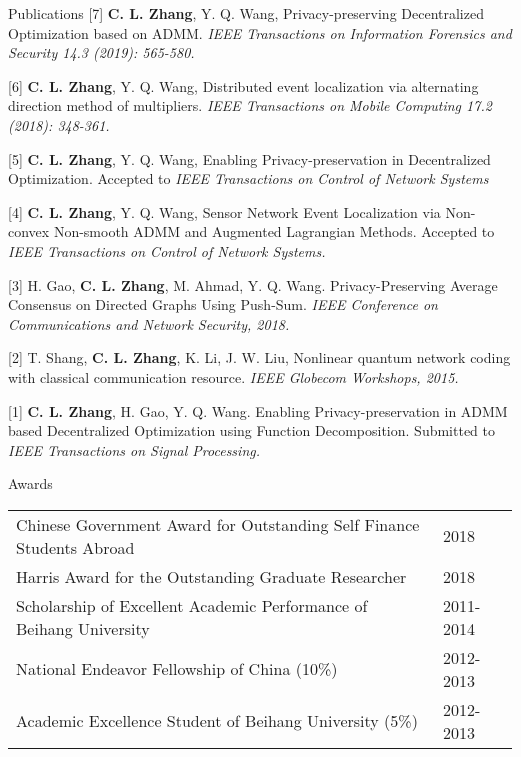 \documentclass{resume} %
\begin{document}
\vspace{3cm}
\begin{rSection}{Publications}	
	[7] \textbf{C. L. Zhang}, Y. Q. Wang, Privacy-preserving Decentralized Optimization based on ADMM. \emph{IEEE Transactions on Information Forensics and Security 14.3 (2019): 565-580.}
	
	[6]	\textbf{C. L. Zhang}, Y. Q. Wang, Distributed event localization via alternating direction method of multipliers. \emph{IEEE Transactions on Mobile Computing 17.2 (2018): 348-361.}
	
	[5] \textbf{C. L. Zhang}, Y. Q. Wang, Enabling Privacy-preservation in Decentralized Optimization.  Accepted to \emph{IEEE Transactions on Control of Network Systems}
		
	[4] \textbf{C. L. Zhang}, Y. Q. Wang, Sensor Network Event Localization via Non-convex Non-smooth ADMM and Augmented Lagrangian Methods. Accepted to  \emph{IEEE Transactions on Control of Network Systems.}
	
	[3] H. Gao, \textbf{C. L. Zhang}, M. Ahmad, Y. Q. Wang. Privacy-Preserving Average Consensus on Directed Graphs Using Push-Sum.  \emph{IEEE Conference on Communications and Network Security, 2018.}
	
	[2] T. Shang, \textbf{C. L. Zhang}, K. Li, J. W. Liu, Nonlinear quantum network coding with classical
	communication resource.  \emph{IEEE Globecom Workshops, 2015.}
	
	[1] \textbf{C. L. Zhang}, H. Gao,  Y. Q. Wang. Enabling Privacy-preservation in ADMM based Decentralized Optimization using Function Decomposition. Submitted to \emph{IEEE Transactions on Signal Processing.}
\end{rSection}


\begin{rSection}{Awards}
\begin{tabular}{ @{} >{}l @{\hspace{23ex}} l }
Chinese Government Award for Outstanding Self Finance Students Abroad  & 2018 \\
Harris Award for the Outstanding Graduate Researcher &2018 \\
Scholarship of Excellent Academic Performance of Beihang University & 2011-2014  \\
National Endeavor Fellowship of China (10\%) & 2012-2013\\
Academic Excellence Student of Beihang University (5\%) & 2012-2013
\end{tabular}\\
\end{rSection}
\end{document}
